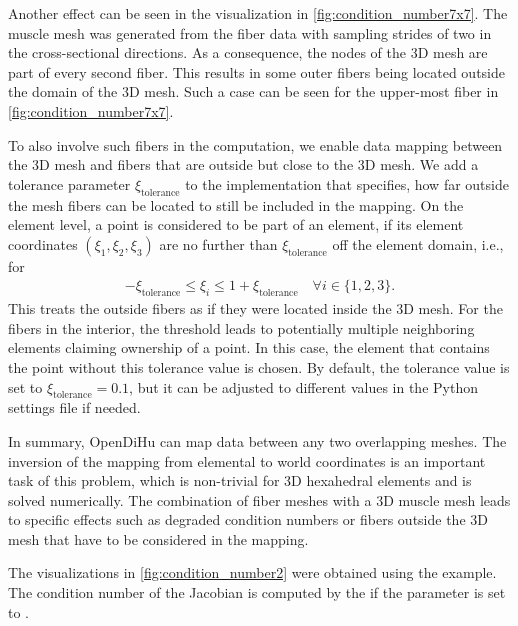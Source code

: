 Another effect can be seen in the visualization in \cref{fig:condition_number7x7}. The muscle mesh was generated from the fiber data with sampling strides of two in the cross-sectional directions. As a consequence, the nodes of the 3D mesh are part of every second fiber. This results in some outer fibers being located outside the domain of the 3D mesh. Such a case can be seen for the upper-most fiber in \cref{fig:condition_number7x7}. 

To also involve such fibers in the computation, we enable data mapping between the 3D mesh and fibers that are outside but close to the 3D mesh. We add a tolerance parameter $\xi_\text{tolerance}$ to the implementation that specifies, how far outside the mesh fibers can be located to still be included in the mapping. On the element level, a point is considered to be part of an element, if its element coordinates $(\xi_1,\xi_2,\xi_3)$ are no further than $\xi_\text{tolerance}$ off the element domain, i.e., for %
\begin{align*}
  -\xi_\text{tolerance} \leq \xi_i \leq 1 + \xi_\text{tolerance}\quad \forall i \in \{1,2,3\}.
\end{align*}
This treats the outside fibers as if they were located inside the 3D mesh. For the fibers in the interior, the threshold leads to potentially multiple neighboring elements claiming ownership of a point. In this case, the element that contains the point without this tolerance value is chosen.
By default, the tolerance value is set to $\xi_\text{tolerance}=0.1$, but it can be adjusted to different values in the Python settings file if needed.

In summary, OpenDiHu can map data between any two overlapping meshes. The inversion of the mapping from elemental to world coordinates is an important task of this problem, which is non-trivial for 3D hexahedral elements and is solved numerically. The combination of fiber meshes with a 3D muscle mesh leads to specific effects such as degraded condition numbers or fibers outside the 3D mesh that have to be considered in the mapping.

\begin{reproduce_no_break}
  The visualizations in \cref{fig:condition_number2} were obtained using the  example. The condition number of the Jacobian is computed by the  if the parameter  is set to .
\end{reproduce_no_break}
